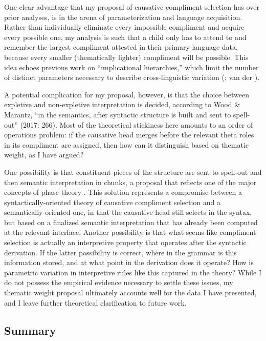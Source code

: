 \documentclass[output=paper,modfonts,nonflat]{langsci/langscibook}
\begin{document}
One clear advantage that my proposal of causative compliment selection has over prior analyses, is in the arena of parameterization and language acquisition. Rather than individually eliminate every impossible compliment and acquire every possible one, my analysis is such that a child only has to attend to and remember the largest compliment attested in their primary language data, because every smaller (thematically lighter) compliment will be possible. This idea echoes previous work on “implicational hierarchies,” which limit the number of distinct parameters necessary to describe cross-linguistic variation (\citealt{HolmbergRoberts2009,Biberauer2011,BiberauerRoberts2012,BiberauerRoberts2015,Sheehan2013,BiberauerEtAl2013}; van der \citealt{WalBiberauer2014,BiberauerEtAl2014,vanderWal2017}).

A potential complication for my proposal, however, is that the choice between expletive and non-expletive interpretation is decided, according to Wood \& Marantz, “in the semantics, after syntactic structure is built and sent to spell-out” (2017: 266). Most of the theoretical stickiness here amounts to an order of operations problem: if the causative head merges before the relevant theta roles in its compliment are assigned, then how can it distinguish based on thematic weight, as I have argued? 


One possibility is that constituent pieces of the structure are sent to spell-out and then semantic interpretation in chunks, a proposal that reflects one of the major concepts of phase theory \citep{Chomsky1999}. This solution represents a compromise between a syntactically-oriented theory of causative compliment selection and a semantically-oriented one, in that the causative head still selects in the syntax, but based on a finalized semantic interpretation that has already been computed at the relevant interface. Another possibility is that what seems like compliment selection is actually an interpretive property that operates after the syntactic derivation. If the latter possibility is correct, where in the grammar is this information stored, and at what point in the derivation does it operate? How is parametric variation in interpretive rules like this captured in the theory? While I do not possess the empirical evidence necessary to settle these issues, my thematic weight proposal ultimately accounts well for the data I have presented, and I leave further theoretical clarification to future work. 

\subsection{Summary}\label{sec:wechsler:4.4}
\end{document}
